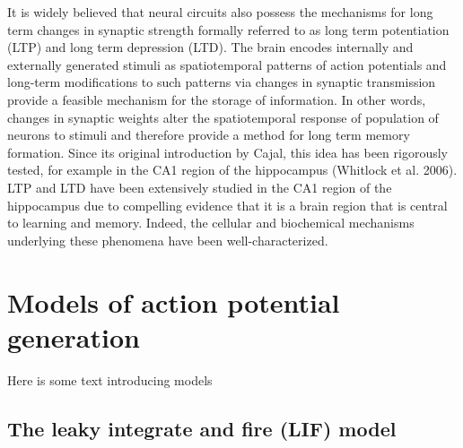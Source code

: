 \documentclass{ucetd}
\begin{document}
It is widely believed that neural circuits also possess the mechanisms for long term changes in synaptic strength formally referred to as long term potentiation (LTP) and long term depression (LTD). The brain encodes internally and externally generated stimuli as spatiotemporal patterns of action potentials and long-term modifications to such patterns via changes in synaptic transmission provide a feasible mechanism for the storage of information. In other words, changes in synaptic weights alter the spatiotemporal response of population of neurons to stimuli and therefore provide a method for long term memory formation. Since its original introduction by Cajal, this idea has been rigorously tested, for example in the CA1 region of the hippocampus (Whitlock et al. 2006). LTP and LTD have been extensively studied in the CA1 region of the hippocampus due to compelling evidence that it is a brain region that is central to learning and memory. Indeed, the cellular and biochemical mechanisms underlying these phenomena have been well-characterized. 


\chapter{Models of action potential generation}

Here is some text introducing models

\section{The leaky integrate and fire (LIF) model}
\end{document}

